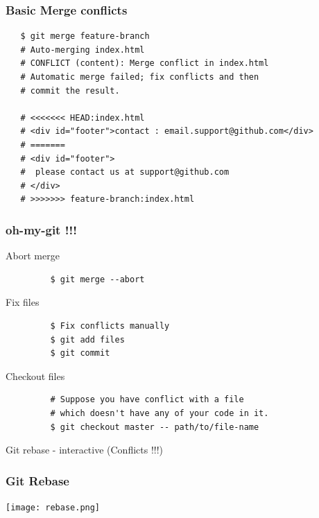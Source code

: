 \documentclass[10pt]{beamer}
\begin{document}
\begin{frame}[fragile]
  \frametitle{Basic Merge conflicts}
   \begin{verbatim}
   $ git merge feature-branch
   # Auto-merging index.html
   # CONFLICT (content): Merge conflict in index.html
   # Automatic merge failed; fix conflicts and then
   # commit the result.

   # <<<<<<< HEAD:index.html
   # <div id="footer">contact : email.support@github.com</div>
   # =======
   # <div id="footer">
   #  please contact us at support@github.com
   # </div>
   # >>>>>>> feature-branch:index.html
   \end{verbatim}
\end{frame}

\begin{frame}[fragile]
  \frametitle{oh-my-git !!!}
    \begin{block}{Abort merge}
      \begin{verbatim}
         $ git merge --abort
    \end{verbatim}
    \end{block}
    \pause
    \begin{block}{Fix files}
      \begin{verbatim}
         $ Fix conflicts manually
         $ git add files
         $ git commit
    \end{verbatim}
    \end{block}
     \pause
    \begin{block}{Checkout files}
      \begin{verbatim}
         # Suppose you have conflict with a file
         # which doesn't have any of your code in it.
         $ git checkout master -- path/to/file-name
    \end{verbatim}
    \end{block}
\end{frame}

\begin{frame}
  \begin{center}
    \Huge{Git rebase - interactive (Conflicts !!!)}
  \end{center}
\end{frame}

\begin{frame}
	\frametitle{Git Rebase}
	\begin{center}
	  \texttt{[image: rebase.png]}
	\end{center}
\end{frame}
\end{document}

